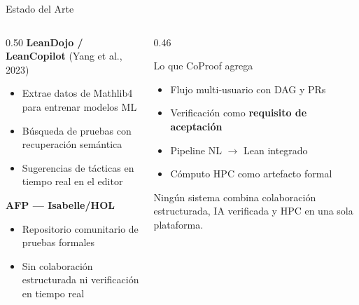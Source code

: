 \documentclass[aspectratio=169, 10pt]{beamer}
\begin{document}
\begin{frame}{Estado del Arte}
  \begin{columns}[T]
    \begin{column}{0.50\textwidth}
      \textbf{LeanDojo / LeanCopilot} \small(Yang et al., 2023)\normalsize
      \vspace{0.2cm}
      \begin{itemize}\large
        \item Extrae datos de Mathlib4 para entrenar modelos ML
        \item B\'{u}squeda de pruebas con recuperaci\'{o}n sem\'{a}ntica
        \item Sugerencias de t\'{a}cticas en tiempo real en el editor
      \end{itemize}
      \vspace{0.35cm}
      \textbf{AFP --- Isabelle/HOL}
      \begin{itemize}\large
        \item Repositorio comunitario de pruebas formales
        \item Sin colaboraci\'{o}n estructurada ni verificaci\'{o}n en tiempo real
      \end{itemize}
    \end{column}
    \begin{column}{0.46\textwidth}
      \begin{block}{Lo que CoProof agrega}
        \begin{itemize}\large
          \item Flujo multi-usuario con DAG y PRs
          \item Verificaci\'{o}n como \textbf{requisito de aceptaci\'{o}n}
          \item Pipeline NL $\to$ Lean integrado
          \item C\'{o}mputo HPC como artefacto formal
        \end{itemize}
      \end{block}
      \vspace{0.3cm}
      {\small\color{cpGray}Ning\'{u}n sistema combina colaboraci\'{o}n estructurada,
      IA verificada y HPC en una sola plataforma.}
    \end{column}
  \end{columns}
\end{frame}
\end{document}
